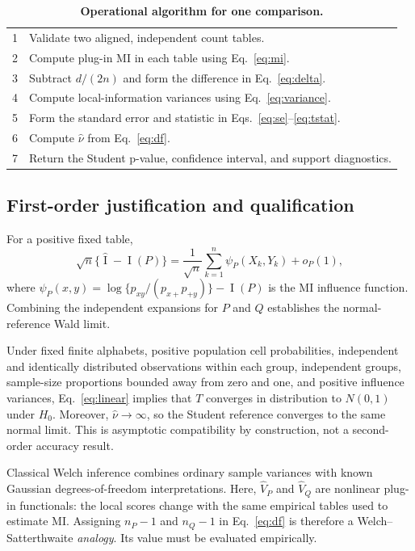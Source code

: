 \documentclass[10pt,twocolumn]{article}
\newcommand{\MI}{\operatorname{I}}
\begin{document}
\begin{table}[t]
\centering
\caption{\textbf{Operational algorithm for one comparison.}}
\label{tab:algorithm}
\begin{tabular}{@{}p{}p{}@{}}
\toprule
1 & Validate two aligned, independent count tables.\\
2 & Compute plug-in MI in each table using Eq.~\eqref{eq:mi}.\\
3 & Subtract \(d/(2n)\) and form the difference in Eq.~\eqref{eq:delta}.\\
4 & Compute local-information variances using Eq.~\eqref{eq:variance}.\\
5 & Form the standard error and statistic in Eqs.~\eqref{eq:se}--\eqref{eq:tstat}.\\
6 & Compute \(\widehat\nu\) from Eq.~\eqref{eq:df}.\\
7 & Return the Student p-value, confidence interval, and support diagnostics.\\
\bottomrule
\end{tabular}
\end{table}

\subsection{First-order justification and qualification}

For a positive fixed table,
\begin{equation}
  \sqrt{n}\{\widehat{\MI}-\MI(P)\}
  =
  \frac{1}{\sqrt{n}}\sum_{k=1}^{n}
  \psi_P(X_k,Y_k)+o_P(1),
  \label{eq:linear}
\end{equation}
where
\(\psi_P(x,y)=\log\{p_{xy}/(p_{x+}p_{+y})\}-\MI(P)\)
is the MI influence function. Combining the independent
expansions for \(P\) and \(Q\) establishes the normal-reference Wald limit.

Under fixed finite alphabets, positive population cell probabilities,
independent and identically distributed observations within each group,
independent groups, sample-size proportions bounded away from zero and one,
and positive influence variances, Eq.~\eqref{eq:linear} implies that \(T\)
converges in distribution to \(N(0,1)\) under \(H_0\). Moreover,
\(\widehat\nu\to\infty\), so the Student reference converges to the same
normal limit. This is asymptotic compatibility by construction, not a
second-order accuracy result.

Classical Welch inference combines ordinary sample
variances with known Gaussian degrees-of-freedom interpretations. Here,
\(\widehat V_P\) and \(\widehat V_Q\) are nonlinear plug-in functionals:
the local scores change with the same empirical tables used to estimate MI.
Assigning \(n_P-1\) and \(n_Q-1\) in Eq.~\eqref{eq:df} is therefore a
Welch--Satterthwaite \emph{analogy}. Its value must be evaluated empirically.
\end{document}
